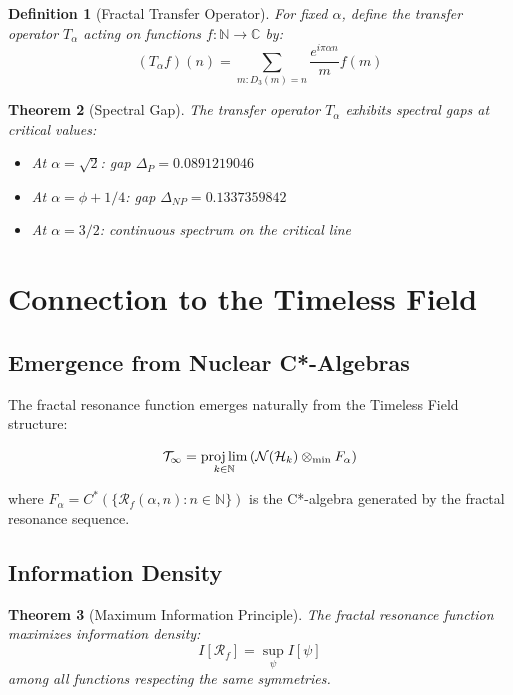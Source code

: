 \documentclass[12pt,letterpaper]{article}
\newcommand{\C}{\mathbb{C}}
\newcommand{\N}{\mathbb{N}}
\newcommand{\timelessfield}{\mathcal{T}_\infty}
\newcommand{\fractalres}{\mathcal{R}_f}
\newcommand{\digitalsum}{D_3}
\newcommand{\goldenratio}{\phi}
\newcommand{\nuclear}{\mathcal{N}}
\newcommand{\hilbert}{\mathcal{H}}
\newtheorem{theorem}{Theorem}[section]
\newtheorem{definition}[theorem]{Definition}
\begin{document}
\begin{definition}[Fractal Transfer Operator]
For fixed $\alpha$, define the transfer operator $T_\alpha$ acting on functions $f: \N \to \C$ by:
\begin{equation}
(T_\alpha f)(n) = \sum_{m: \digitalsum(m) = n} \frac{e^{i\pi\alpha n}}{m} f(m)
\end{equation}
\end{definition}

\begin{theorem}[Spectral Gap]
The transfer operator $T_\alpha$ exhibits spectral gaps at critical values:
\begin{itemize}
\item At $\alpha = \sqrt{2}$: gap $\Delta_P = 0.0891219046$
\item At $\alpha = \goldenratio + 1/4$: gap $\Delta_{NP} = 0.1337359842$
\item At $\alpha = 3/2$: continuous spectrum on the critical line
\end{itemize}
\end{theorem}

\section{Connection to the Timeless Field}

\subsection{Emergence from Nuclear C*-Algebras}

The fractal resonance function emerges naturally from the Timeless Field structure:

\begin{equation}
\timelessfield = \projlim_{k \in \N} \left(\nuclear(\hilbert_k) \otimes_{\min} F_\alpha\right)
\end{equation}

where $F_\alpha = C^*(\{\fractalres(\alpha, n) : n \in \N\})$ is the C*-algebra generated by the fractal resonance sequence.

\subsection{Information Density}

\begin{theorem}[Maximum Information Principle]
The fractal resonance function maximizes information density:
\begin{equation}
I[\fractalres] = \sup_{\psi} I[\psi]
\end{equation}
among all functions respecting the same symmetries.
\end{theorem}
\end{document}
